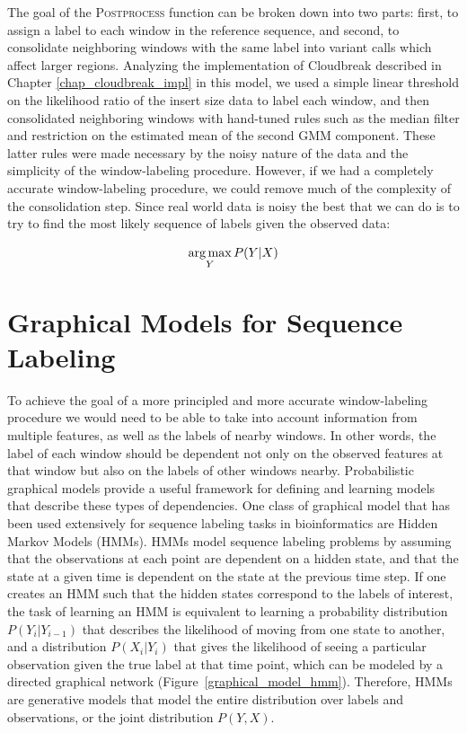 The goal of the \textsc{Postprocess} function can be broken down into two parts: first, to assign a label to each window in the reference sequence, and second, to consolidate neighboring windows with the same label into variant calls which affect larger regions. Analyzing the implementation of Cloudbreak described in Chapter \ref{chap_cloudbreak_impl} in this model, we used a simple linear threshold on the likelihood ratio of the insert size data to label each window, and then consolidated neighboring windows with hand-tuned rules such as the median filter and restriction on the estimated mean of the second GMM component. These latter rules were made necessary by the noisy nature of the data and the simplicity of the window-labeling procedure. However, if we had a completely accurate window-labeling procedure, we could remove much of the complexity of the consolidation step. Since real world data is noisy the best that we can do is to try to find the most likely sequence of labels given the observed data:

\[ \operatorname*{arg\,max}_Y P(Y|X) \]


\section{Graphical Models for Sequence Labeling}

To achieve the goal of a more principled and more accurate window-labeling procedure we would need to be able to take into account information from multiple features, as well as the labels of nearby windows. In other words, the label of each window should be dependent not only on the observed features at that window but also on the labels of other windows nearby. Probabilistic graphical models provide a useful framework for defining and learning models that describe these types of dependencies. One class of graphical model that has been used extensively for sequence labeling tasks in bioinformatics are Hidden Markov Models (HMMs). HMMs model sequence labeling problems by assuming that the observations at each point are dependent on a hidden state, and that the state at a given time is dependent on the state at the previous time step. If one creates an HMM such that the hidden states correspond to the labels of interest, the task of learning an HMM is equivalent to learning a probability distribution $P(Y_i|Y_{i-1})$ that describes the likelihood of moving from one state to another, and a distribution $P(X_i|Y_i)$ that gives the likelihood of seeing a particular observation given the true label at that time point, which can be modeled by a directed graphical network (Figure~\ref{graphical_model_hmm}). Therefore, HMMs are generative models that model the entire distribution over labels and observations, or the joint distribution $P(Y,X)$. 

